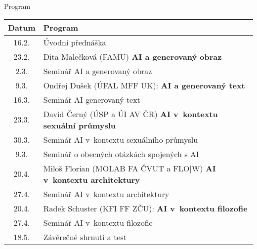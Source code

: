 \begin{frame}{Program}

    \vspace{-2pt}\small\centering
    \begin{tabular}{cl}
        \toprule
    Datum   &   Program \\ \midrule
    16.2.   & Úvodní přednáška \\ \midrule

    23.2.  & Dita Malečková (FAMU) \hfill \textbf{AI a generovaný obraz}  \\
     2.3.  & Seminář AI a generovaný obraz \\ \midrule

    9.3. & Ondřej Dušek (ÚFAL MFF UK): \hfill \textbf{AI a generovaný text} \\
    16.3. & Seminář AI generovaný text \\ \midrule

    23.3. & David Černý (ÚSP a ÚI AV ČR) \hfill \textbf{AI v~kontextu sexuální průmyslu} \\
	30.3. & Seminář AI v~kontextu sexuálního průmyslu \\ \midrule

	9.3. & Seminář o obecných otázkách spojených s AI \\ \midrule

        20.4. & Miloš Florian (MOLAB FA ČVUT a FLO|W) \hfill \textbf{AI v~kontextu architektury} \\
	27.4. & Seminář AI v~kontextu architektury \\ \midrule

    20.4. & Radek Schuster (KFI FF ZČU): \hfill \textbf{AI v~kontextu filozofie} \\
	27.4. & Seminář AI v~kontextu filozofie \\ \midrule

    18.5.  & Závěrečné shrnutí a test \\
    \bottomrule
    \end{tabular}

\end{frame}
